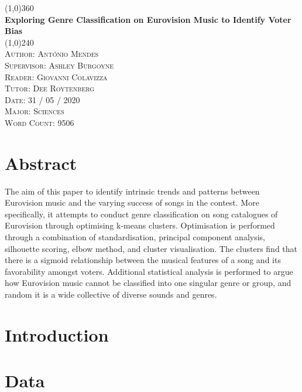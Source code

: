 \documentclass{article}
\begin{document}
\begin{titlepage}
  \begin{center}
    \line(1,0){360} \\
    [0.5 cm]
    \huge{\bfseries Exploring Genre Classification on Eurovision Music
      to Identify Voter Bias} \\
    [0.2 cm]
    \line(1,0){240} \\
    [4 cm]
    \begingroup
    \fontsize{10pt}{20pt}\selectfont
    \textsc{\normalsize 
      Author: António Mendes \\ [0.25cm]
      Supervisor: Ashley Burgoyne \\ [0.25cm]
      Reader: Giovanni Colavizza \\ [0.25cm]
      Tutor: Dee Roytenberg \\ [0.25cm]
      Date: 31 / 05 / 2020 \\ [0.25cm]
      Major: Sciences \\ [0.25cm]
      Word Count: 9506 \\ [0.25cm]
    }
    \endgroup
  \end{center}
\end{titlepage}


\tableofcontents
\thispagestyle{empty}

\pagebreak
\setcounter{page}{1}
\section{Abstract}
The aim of this paper to identify intrinsic trends and patterns between
Eurovision music and the varying success of songs in the contest. More
specifically, it attempts to conduct genre classification on song
catalogues of Eurovision through optimising k-means
clusters. Optimisation is performed through a combination of
standardisation, principal component analysis, silhouette scoring,
elbow method, and cluster visualisation. The clusters find that there
is a sigmoid relationship between the musical features of a song and
its favorability amongst voters.  Additional statistical analysis is
performed to argue how Eurovision music cannot be classified into one
singular genre or group, and random it is a wide collective of diverse
sounds and genres.


\newpage
\section{Introduction}

\newpage
\section{Data}
\end{document}
